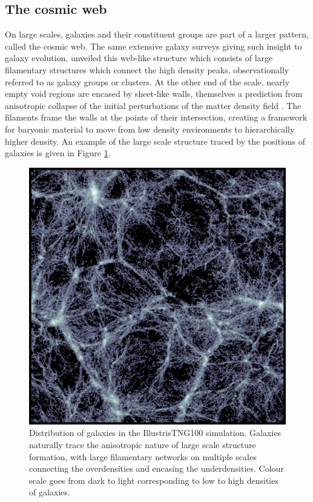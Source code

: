 \subsection{The cosmic web}
On large scales, galaxies and their constituent groups are part of a larger pattern, called the cosmic web. The same extensive galaxy surveys giving such insight to galaxy evolution, unveiled this web-like structure \citep[e.g.][]{delapparent1986, colless2001, tegmark2004} which consists of large filamentary structures which connect the high density peaks, observationally referred to as galaxy groups or clusters. At the other end of the scale, nearly empty void regions are encased by sheet-like walls, themselves a prediction from anisotropic collapse of the initial perturbations of the matter density field \citep{zeldovich1970, shandarin1989}. The filaments frame the walls at the points of their intersection, creating a framework for baryonic material to move from low density environments to hierarchically higher density. An example of the large scale structure traced by the positions of galaxies is given in Figure \ref{fig:cosmo_web_tng}.

\begin{figure}
	\includegraphics[width=\linewidth]{thesis/latex/introduction/slice_image_bone.pdf}
    \caption{Distribution of galaxies in the IllustrisTNG100 simulation. Galaxies naturally trace the anisotropic nature of large scale structure formation, with large filamentary networks on multiple scales connecting the overdensities and encasing the underdensities. Colour scale goes from dark to light corresponding to low to high densities of galaxies.}
    \label{fig:cosmo_web_tng}
\end{figure}

